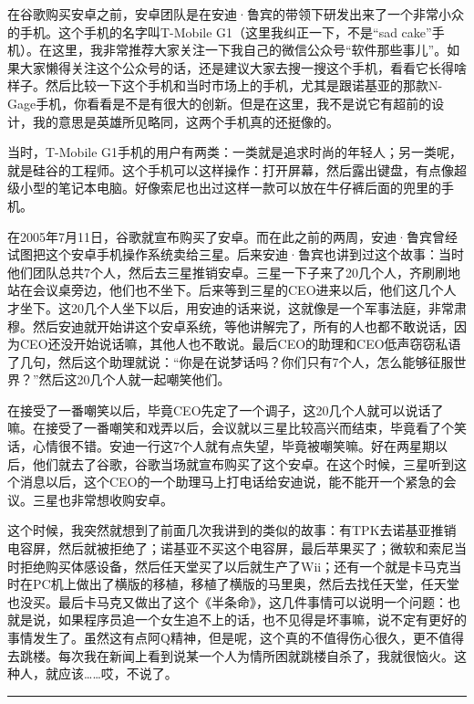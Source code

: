 \documentclass[
  letterpaper,
  DIV=11,
  numbers=noendperiod]{scrreprt}
\begin{document}
在谷歌购买安卓之前，安卓团队是在安迪·鲁宾的带领下研发出来了一个非常小众的手机。这个手机的名字叫T-Mobile
G1（这里我纠正一下，不是``sad
cake''手机）。在这里，我非常推荐大家关注一下我自己的微信公众号``软件那些事儿''。如果大家懒得关注这个公众号的话，还是建议大家去搜一搜这个手机，看看它长得啥样子。然后比较一下这个手机和当时市场上的手机，尤其是跟诺基亚的那款N-Gage手机，你看看是不是有很大的创新。但是在这里，我不是说它有超前的设计，我的意思是英雄所见略同，这两个手机真的还挺像的。

当时，T-Mobile
G1手机的用户有两类：一类就是追求时尚的年轻人；另一类呢，就是硅谷的工程师。这个手机可以这样操作：打开屏幕，然后露出键盘，有点像超级小型的笔记本电脑。好像索尼也出过这样一款可以放在牛仔裤后面的兜里的手机。

在2005年7月11日，谷歌就宣布购买了安卓。而在此之前的两周，安迪·鲁宾曾经试图把这个安卓手机操作系统卖给三星。后来安迪·鲁宾也讲到过这个故事：当时他们团队总共7个人，然后去三星推销安卓。三星一下子来了20几个人，齐刷刷地站在会议桌旁边，他们也不坐下。后来等到三星的CEO进来以后，他们这几个人才坐下。这20几个人坐下以后，用安迪的话来说，这就像是一个军事法庭，非常肃穆。然后安迪就开始讲这个安卓系统，等他讲解完了，所有的人也都不敢说话，因为CEO还没开始说话嘛，其他人也不敢说。最后CEO的助理和CEO低声窃窃私语了几句，然后这个助理就说：``你是在说梦话吗？你们只有7个人，怎么能够征服世界？''然后这20几个人就一起嘲笑他们。

在接受了一番嘲笑以后，毕竟CEO先定了一个调子，这20几个人就可以说话了嘛。在接受了一番嘲笑和戏弄以后，会议就以三星比较高兴而结束，毕竟看了个笑话，心情很不错。安迪一行这7个人就有点失望，毕竟被嘲笑嘛。好在两星期以后，他们就去了谷歌，谷歌当场就宣布购买了这个安卓。在这个时候，三星听到这个消息以后，这个CEO的一个助理马上打电话给安迪说，能不能开一个紧急的会议。三星也非常想收购安卓。

这个时候，我突然就想到了前面几次我讲到的类似的故事：有TPK去诺基亚推销电容屏，然后就被拒绝了；诺基亚不买这个电容屏，最后苹果买了；微软和索尼当时拒绝购买体感设备，然后任天堂买了以后就生产了Wii；还有一个就是卡马克当时在PC机上做出了横版的移植，移植了横版的马里奥，然后去找任天堂，任天堂也没买。最后卡马克又做出了这个《半条命》，这几件事情可以说明一个问题：也就是说，如果程序员追一个女生追不上的话，也不见得是坏事嘛，说不定有更好的事情发生了。虽然这有点阿Q精神，但是呢，这个真的不值得伤心很久，更不值得去跳楼。每次我在新闻上看到说某一个人为情所困就跳楼自杀了，我就很恼火。这种人，就应该\ldots\ldots 哎，不说了。

\begin{center}\rule{0.5\linewidth}{0.5pt}\end{center}
\end{document}

